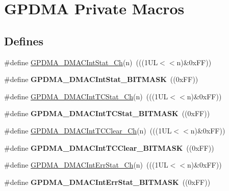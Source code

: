 \hypertarget{group___g_p_d_m_a___private___macros}{\section{\-G\-P\-D\-M\-A \-Private \-Macros}
\label{group___g_p_d_m_a___private___macros}
}
\subsection*{\-Defines}
\begin{DoxyCompactItemize}
\item 
\#define \hyperlink{group___g_p_d_m_a___private___macros_ga85994f6ec0dbce757432c8f28b2f3924}{\-G\-P\-D\-M\-A\-\_\-\-D\-M\-A\-C\-Int\-Stat\-\_\-\-Ch}(n)~(((1\-U\-L$<$$<$n)\&0x\-F\-F))
\item 
\hypertarget{group___g_p_d_m_a___private___macros_gaa777d7b1a7bebd22513eb6c9e34493c4}{\#define {\bfseries \-G\-P\-D\-M\-A\-\_\-\-D\-M\-A\-C\-Int\-Stat\-\_\-\-B\-I\-T\-M\-A\-S\-K}~((0x\-F\-F))}\label{group___g_p_d_m_a___private___macros_gaa777d7b1a7bebd22513eb6c9e34493c4}

\item 
\#define \hyperlink{group___g_p_d_m_a___private___macros_gae74492976a7261ecaf72656f4978200b}{\-G\-P\-D\-M\-A\-\_\-\-D\-M\-A\-C\-Int\-T\-C\-Stat\-\_\-\-Ch}(n)~(((1\-U\-L$<$$<$n)\&0x\-F\-F))
\item 
\hypertarget{group___g_p_d_m_a___private___macros_ga995646202bbc8ed9bb41ab12df9ad22f}{\#define {\bfseries \-G\-P\-D\-M\-A\-\_\-\-D\-M\-A\-C\-Int\-T\-C\-Stat\-\_\-\-B\-I\-T\-M\-A\-S\-K}~((0x\-F\-F))}\label{group___g_p_d_m_a___private___macros_ga995646202bbc8ed9bb41ab12df9ad22f}

\item 
\#define \hyperlink{group___g_p_d_m_a___private___macros_ga01b8235e02aa6e595ef574a32c9a79cd}{\-G\-P\-D\-M\-A\-\_\-\-D\-M\-A\-C\-Int\-T\-C\-Clear\-\_\-\-Ch}(n)~(((1\-U\-L$<$$<$n)\&0x\-F\-F))
\item 
\hypertarget{group___g_p_d_m_a___private___macros_gac36d31c685a330710169fb2b6b483c93}{\#define {\bfseries \-G\-P\-D\-M\-A\-\_\-\-D\-M\-A\-C\-Int\-T\-C\-Clear\-\_\-\-B\-I\-T\-M\-A\-S\-K}~((0x\-F\-F))}\label{group___g_p_d_m_a___private___macros_gac36d31c685a330710169fb2b6b483c93}

\item 
\#define \hyperlink{group___g_p_d_m_a___private___macros_ga970120fa6e7958db5cb0feadaa1f161c}{\-G\-P\-D\-M\-A\-\_\-\-D\-M\-A\-C\-Int\-Err\-Stat\-\_\-\-Ch}(n)~(((1\-U\-L$<$$<$n)\&0x\-F\-F))
\item 
\hypertarget{group___g_p_d_m_a___private___macros_ga000aa0dbfbad569e5a6d1a0db7ff7c4b}{\#define {\bfseries \-G\-P\-D\-M\-A\-\_\-\-D\-M\-A\-C\-Int\-Err\-Stat\-\_\-\-B\-I\-T\-M\-A\-S\-K}~((0x\-F\-F))}\label{group___g_p_d_m_a___private___macros_ga000aa0dbfbad569e5a6d1a0db7ff7c4b}


\end{DoxyCompactItemize}
